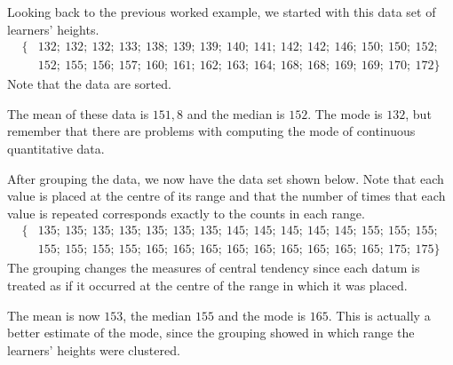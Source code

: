 Looking back to the previous worked example, we started with this data
set of learners' heights.
\begin{align*}
  \{&132;\ 132;\ 132;\ 133;\ 138;\ 139;\ 139;\ 140;\ 141;\ 142;\ 142;\ 146;\ 150;\ 150;\ 152;\\
    &152;\ 155;\ 156;\ 157;\ 160;\ 161;\ 162;\ 163;\ 164;\ 168;\ 168;\ 169;\ 169;\ 170;\ 172\}
\end{align*}
Note that the data are sorted.

The mean of these data is $151,8$ and the median is $152$. The mode is
$132$, but remember that there are problems with computing the mode of
continuous quantitative data.\par

After grouping the data, we now have the data set shown below. Note
that each value is placed at the centre of its range and that the
number of times that each value is repeated corresponds exactly to the
counts in each range.
\begin{align*}
  \{&135;\ 135;\ 135;\ 135;\ 135;\ 135;\ 135;\ 145;\ 145;\ 145;\ 145;\ 145;\ 155;\ 155;\ 155;\\
    &155;\ 155;\ 155;\ 155;\ 165;\ 165;\ 165;\ 165;\ 165;\ 165;\ 165;\ 165;\ 165;\ 175;\ 175\}
\end{align*}
The grouping changes the measures of central tendency since each datum
is treated as if it occurred at the centre of the range in which it was
placed.\par

The mean is now $153$, the median $155$ and the mode is $165$. This is
actually a better estimate of the mode, since the grouping showed in
which range the learners' heights were clustered.


